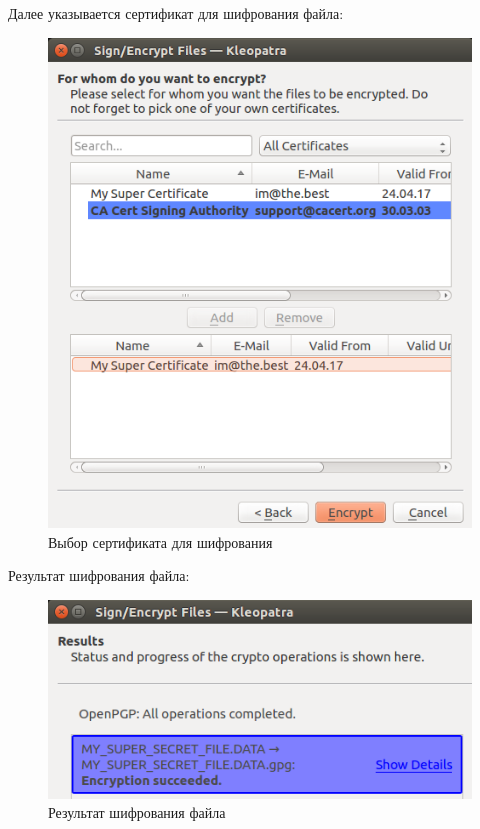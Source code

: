 \documentclass[14pt,a4paper,report]{report}
\begin{document}
Далее указывается сертификат для шифрования файла:

\begin{figure}[h!]
	\centering
	\includegraphics[scale = 0.53]{images/2_3.png}
	
	\caption{Выбор сертификата для шифрования}
	\label{image:8}
\end{figure}

Результат шифрования файла:

\begin{figure}[h!]
	\centering
	\includegraphics[scale = 0.53]{images/2_4.png}
	
	\caption{Результат шифрования файла}
	\label{image:9}
\end{figure}
\end{document}
